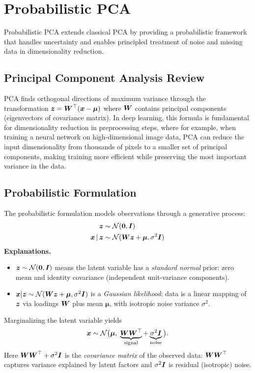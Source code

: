 
\section{Probabilistic PCA }
\label{sec:prob-pca}

Probabilistic PCA extends classical PCA by providing a probabilistic framework that handles uncertainty and enables principled treatment of noise and missing data in dimensionality reduction.

\subsection{Principal Component Analysis Review}

PCA finds orthogonal directions of maximum variance through the transformation $\boldsymbol{z} = \boldsymbol{W}^\top (\boldsymbol{x} - \boldsymbol{\mu})$ where $\boldsymbol{W}$ contains principal components (eigenvectors of covariance matrix). In deep learning, this formula is fundamental for dimensionality reduction in preprocessing steps, where for example, when training a neural network on high-dimensional image data, PCA can reduce the input dimensionality from thousands of pixels to a smaller set of principal components, making training more efficient while preserving the most important variance in the data.

\subsection{Probabilistic Formulation}

The probabilistic formulation models observations through a generative process:
\begin{align}
\boldsymbol{z} &\sim \mathcal{N}(\boldsymbol{0}, \boldsymbol{I}) \\
\boldsymbol{x} \,|\, \boldsymbol{z} &\sim \mathcal{N}(\boldsymbol{W}\boldsymbol{z} + \boldsymbol{\mu}, \sigma^2 \boldsymbol{I})
\end{align}
\noindent\textbf{Explanations.}
\begin{itemize}[leftmargin=1.5em]
  \item $\boldsymbol{z} \sim \mathcal{N}(\boldsymbol{0}, \boldsymbol{I})$ means the latent variable has a \emph{standard normal} prior: zero mean and identity covariance (independent unit-variance components).
  \item $\boldsymbol{x} | \boldsymbol{z} \sim \mathcal{N}(\boldsymbol{W}\boldsymbol{z}+\boldsymbol{\mu}, \sigma^2\boldsymbol{I})$ is a \emph{Gaussian likelihood}: data is a linear mapping of $\boldsymbol{z}$ via loadings $\boldsymbol{W}$ plus mean $\boldsymbol{\mu}$, with isotropic noise variance $\sigma^2$.
\end{itemize}
Marginalizing the latent variable yields
\begin{equation}
\boldsymbol{x} \sim \mathcal{N}\big(\boldsymbol{\mu},\; \underbrace{\boldsymbol{W}\boldsymbol{W}^\top}_{\text{signal}} + \underbrace{\sigma^2\boldsymbol{I}}_{\text{noise}}\big).
\end{equation}
Here $\boldsymbol{W}\boldsymbol{W}^\top + \sigma^2\boldsymbol{I}$ is the \emph{covariance matrix} of the observed data: $\boldsymbol{W}\boldsymbol{W}^\top$ captures variance explained by latent factors and $\sigma^2\boldsymbol{I}$ is residual (isotropic) noise.

